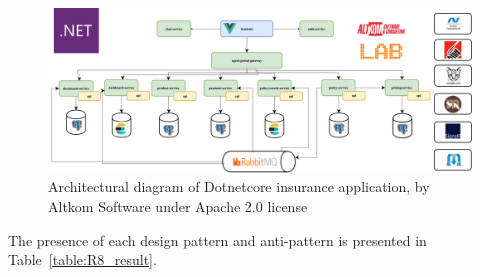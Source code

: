 \documentclass{Configuration_Files/PoliMi3i_thesis}
\begin{document}
\begin{figure}[H]
\centering
\includegraphics[width=1\textwidth]{myImages/R8.png}
\caption{Architectural diagram of Dotnetcore insurance application, by Altkom Software under Apache 2.0 license}
\label{fig:R8_arch}
\end{figure}

The presence of each design pattern and anti-pattern is presented in Table~\ref{table:R8_result}.
\end{document}
